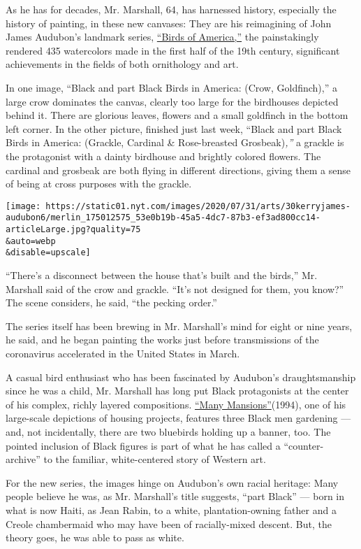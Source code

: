 As he has for decades, Mr. Marshall, 64, has harnessed history,
especially the history of painting, in these new canvases: They are his
reimagining of John James Audubon's landmark series,
\href{https://www.audubon.org/birds-of-america}{``Birds of America,''}
the painstakingly rendered 435 watercolors made in the first half of the
19th century, significant achievements in the fields of both ornithology
and art.

In one image, ``Black and part Black Birds in America: (Crow,
Goldfinch),'' a large crow dominates the canvas, clearly too large for
the birdhouses depicted behind it. There are glorious leaves, flowers
and a small goldfinch in the bottom left corner. In the other picture,
finished just last week, ``Black and part Black Birds in America:
(Grackle, Cardinal \& Rose-breasted Grosbeak)\emph{,''} a grackle is the
protagonist with a dainty birdhouse and brightly colored flowers. The
cardinal and grosbeak are both flying in different directions, giving
them a sense of being at cross purposes with the grackle.

\texttt{[image: https://static01.nyt.com/images/2020/07/31/arts/30kerryjames-audubon6/merlin\_175012575\_53e0b19b-45a5-4dc7-87b3-ef3ad800cc14-articleLarge.jpg?quality=75\\\&auto=webp\\\&disable=upscale]}

``There's a disconnect between the house that's built and the birds,''
Mr. Marshall said of the crow and grackle. ``It's not designed for them,
you know?'' The scene considers, he said, ``the pecking order.''

The series itself has been brewing in Mr. Marshall's mind for eight or
nine years, he said, and he began painting the works just before
transmissions of the coronavirus accelerated in the United States in
March.

A casual bird enthusiast who has been fascinated by Audubon's
draughtsmanship since he was a child, Mr. Marshall has long put Black
protagonists at the center of his complex, richly layered compositions.
\href{https://www.artic.edu/artworks/137125/many-mansions}{``Many
Mansions''}(1994), one of his large-scale depictions of housing
projects, features three Black men gardening --- and, not incidentally,
there are two bluebirds holding up a banner, too. The pointed inclusion
of Black figures is part of what he has called a ``counter-archive'' to
the familiar, white-centered story of Western art.

For the new series, the images hinge on Audubon's own racial heritage:
Many people believe he was, as Mr. Marshall's title suggests, ``part
Black'' --- born in what is now Haiti, as Jean Rabin, to a white,
plantation-owning father and a Creole chambermaid who may have been of
racially-mixed descent. But, the theory goes, he was able to pass as
white.

